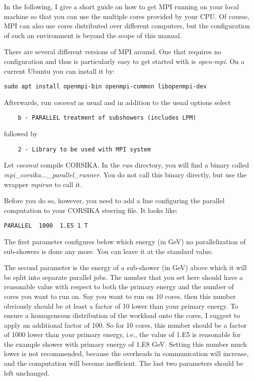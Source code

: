 \documentclass[a4paper,10pt]{article}
\begin{document}
In the following, I give a short guide on how to get MPI running on your local machine so that you can use the multiple cores provided by your CPU. Of course, MPI can also use cores distributed over different computers, but the configuration of such an environment is beyond the scope of this manual.

There are several different versions of MPI around. One that requires no configuration and thus is particularly easy to get started with is {\em open-mpi}. On a current Ubuntu you can install it by:
%
\begin{verbatim}
sudo apt install openmpi-bin openmpi-common libopenmpi-dev
\end{verbatim}
%
Afterwards, run {\em coconut} as usual and in addition to the usual options select
%
\begin{verbatim}
    b - PARALLEL treatment of subshowers (includes LPM)
\end{verbatim}
%
followed by
%
\begin{verbatim}
    2 - Library to be used with MPI system
\end{verbatim}
%
Let {\em coconut} compile CORSIKA. In the {\em run} directory, you will find a binary called {\em mpi\_corsika...\_parallel\_runner}. You do not call this binary directly, but use the wrapper {\em mpirun} to call it.

Before you do so, however, you need to add a line configuring the parallel computation to your CORSIKA steering file. It looks like:
%
\begin{verbatim}
PARALLEL  1000  1.E5 1 T
\end{verbatim}
%
The first parameter configures below which energy (in GeV) no parallelization of sub-showers is done any more. You can leave it at the standard value.

The second parameter is the energy of a sub-shower (in GeV) above which it will be split into separate parallel jobs. The number that you set here should have a reasonable value with respect to both the primary energy and the number of cores you want to run on. Say you want to run on 10 cores, then this number obviously should be at least a factor of 10 lower than your primary energy. To ensure a homogeneous distribution of the workload onto the cores, I suggest to apply an additional factor of 100. So for 10 cores, this number should be a factor of 1000 lower than your primary energy, i.e., the value of 1.E5 is reasonable for the example shower with primary energy of 1.E8 GeV. Setting this number much lower is not recommended, because the overheads in communication will increase, and the computation will become inefficient. The last two parameters should be left unchanged.
\end{document}
